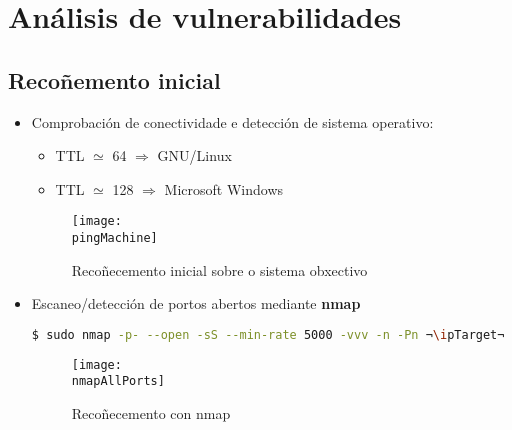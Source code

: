 \documentclass[a4paper]{article}
\newcommand{\pingMachine}{ping_template.png}
\newcommand{\nmapAllPorts}{nmap_template_allPorts.png}
\newcommand{\ipTarget}{10.10.10.248}
\begin{document}
        \clearpage

        \section{Análisis de vulnerabilidades}
        \subsection{Recoñemento inicial}
        \vspace{0.2cm}
        \begin{itemize}
                \item Comprobación de conectividade e detección de sistema operativo: 
                \begin{itemize}
                        \item TTL $\simeq$ 64 $\Rightarrow$ GNU/Linux
                        \item TTL $\simeq$ 128 $\Rightarrow$ Microsoft Windows
                \end{itemize}

        \begin{figure}[h]
                \begin{center}
                        \begin{tcolorbox}[colback=blackFondoImaxes,hbox]
                                \texttt{[image: \\pingMachine]}
                        \end{tcolorbox}
                \end{center}
                \caption{Recoñecemento inicial sobre o sistema obxectivo}
        \end{figure}

        \vspace{0.2cm}

                \item Escaneo/detección de portos abertos mediante \textbf{nmap}
        \begin{lstlisting}[language=Bash, caption=nmap: Portos TCP open]
$ sudo nmap -p- --open -sS --min-rate 5000 -vvv -n -Pn ¬\ipTarget¬
        \end{lstlisting}
         \begin{figure}[h]
                \begin{center}
                        \begin{tcolorbox}[colback=blackFondoImaxes,hbox]
                                \centering
                                \texttt{[image: \\nmapAllPorts]}
                        \end{tcolorbox}
                \end{center}
                \caption{Recoñecemento con nmap}
        \end{figure}


\end{itemize}
\end{document}
